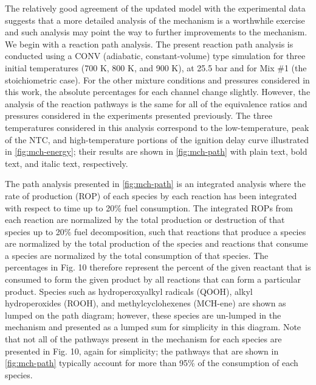 \documentclass[12pt, letterpaper]{article}
\begin{document}
The relatively good agreement of the updated model with the experimental data 
suggests that a more detailed analysis of the mechanism is a worthwhile 
exercise and such analysis may point the way to further improvements to the 
mechanism. We begin with a reaction path analysis. The present reaction path 
analysis is conducted using a CONV (adiabatic, constant-volume) type simulation 
for three initial temperatures (700 K, 800 K, and 900 K), at 25.5 bar and for 
Mix \#1 (the stoichiometric case). For the other mixture conditions and 
pressures considered in this work, the absolute percentages for each channel 
change slightly. However, the analysis of the reaction pathways is the same for 
all of the equivalence ratios and pressures considered in the experiments 
presented previously. The three temperatures considered in this analysis 
correspond to the low-temperature, peak of the NTC, and high-temperature 
portions of the ignition delay curve illustrated in \autoref{fig:mch-energy}; 
their results are shown in \autoref{fig:mch-path} with plain text, bold text, 
and italic text, respectively. 

The path analysis presented in \autoref{fig:mch-path} is an integrated analysis 
where the rate of production (ROP) of each species by each reaction has been 
integrated with respect to time up to 20\% fuel consumption. The integrated 
ROPs from each reaction are normalized by the total production or destruction 
of that species up to 20\% fuel decomposition, such that reactions that produce 
a species are normalized by the total production of the species and reactions 
that consume a species are normalized by the total consumption of that species. 
The percentages in Fig. 10 therefore represent the percent of the given 
reactant that is consumed to form the given product by all reactions that can 
form a particular product. Species such as hydroperoxyalkyl radicals (QOOH), 
alkyl hydroperoxides (ROOH), and methylcyclohexenes (MCH-ene) are shown as 
lumped on the path diagram; however, these species are un-lumped in the 
mechanism and presented as a lumped sum for simplicity in this diagram. Note 
that not all of the pathways present in the mechanism for each species are 
presented in Fig. 10, again for simplicity; the pathways that are shown in 
\autoref{fig:mch-path} typically account for more than 95\% of the consumption 
of each species.
\end{document}
